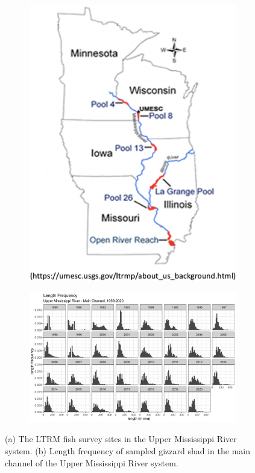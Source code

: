 \documentclass[preprint,review,12pt,authoryear]{elsarticle}
\begin{document}
\begin{figure}
\centering
\begin{subfigure}[b]{.43\textwidth}  
  \includegraphics[width=.6\textwidth]{figures/field_stations.png}
  \caption{}
  \label{fig:field_stations}
\end{subfigure}
\begin{subfigure}[b]{.43\textwidth} 
   \includegraphics[width=1.2\textwidth]{figures/LTRMmain.png}
   \caption{}
   \label{fig:LTRMmain}
\end{subfigure}
\caption{(a) The LTRM fish survey sites in the Upper Mississippi River system. (b) Length frequency of sampled gizzard shad in the main channel of the Upper Mississippi River system.}
\end{figure}    
\end{document}
